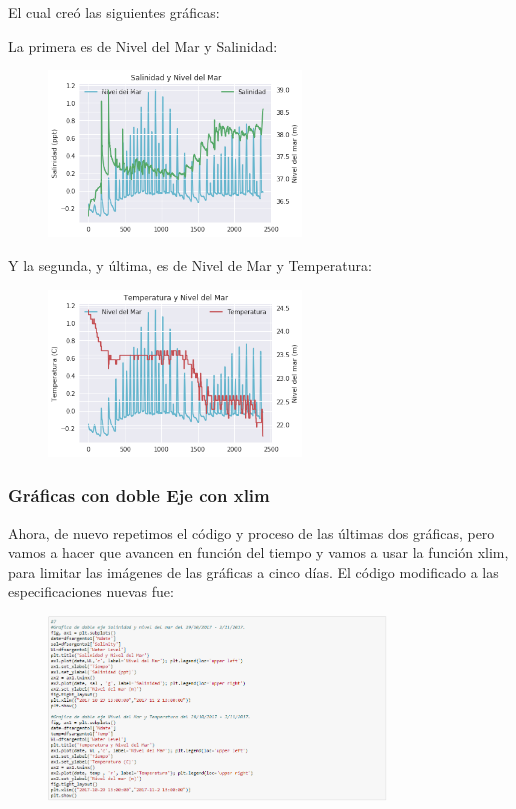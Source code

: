 \documentclass[a4paper]{article}
\begin{document}
El cual creó las siguientes gráficas:

\pagebreak
La primera es de Nivel del Mar y Salinidad:
\begin{figure}[ht!]
 \centering
  \includegraphics[width=0.6\textwidth]{Matplotlib4.png}
\end{figure}

Y la segunda, y última, es de Nivel de Mar y Temperatura:
\begin{figure}[ht!]
 \centering
  \includegraphics[width=0.6\textwidth]{Matplotlib5.png}
\end{figure}

\subsubsection{Gráficas con doble Eje con xlim}
Ahora, de nuevo repetimos el código y proceso de las últimas dos gráficas, pero vamos a hacer que avancen en función del tiempo y vamos a usar la función xlim, para limitar las imágenes de las gráficas a cinco días. El código modificado a las especificaciones nuevas fue:
\begin{figure}[ht!]
 \centering
  \includegraphics[width=0.8\textwidth]{DoblexLimCodigo.PNG}
\end{figure}
\end{document}
